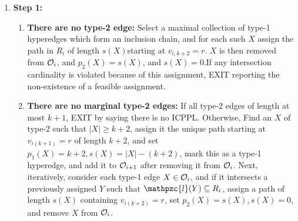 \documentclass[11pt,letter]{../lib/llncs}
\def\cO{{\cal O}}
\def\cl{\mathpzc{l}}
\begin{document}
\begin{enumerate}
\item {\bf Step 1:}  
\begin{enumerate}
\item {\bf There are no type-2 edge:}  Select a maximal collection of type-1 hyperedges which form an inclusion chain, and for each such $X$ assign the path in $R_i$ of length $s(X)$starting at $v_{i,k+2}=r$.  $X$ is then removed from $\cO_i$, and $p_2(X)=s(X)$, and $s(X)=0$.If any intersection cardinality is violated because of this assignment,  EXIT reporting the non-existence of a feasible assignment. 
\item {\bf There are no marginal type-2 edges:}  If all type-2 edges of length at most $k+1$, EXIT by saying there is no ICPPL.  Otherwise, Find an $X$ of type-2 such that $|X| \geq k+2$, assign it the unique path starting at $v_{i(k+1)}=r$ of length $k+2$, and set $p_1(X)=k+2, s(X)=|X|-(k+2)$, mark this as a type-1 hyperedge, and add it to $\cO_{i+1}$ after removing it from $\cO_i$.  Next, iteratively, consider each type-1 edge $X \in \cO_i$, and if it intersects a previously assigned $Y$ such that $\cl(Y) \subseteq R_i$, assign a path of length $s(X)$ containing $v_{i(k+2)}=r$, set $p_2(X)=s(X), s(X)=0$, and remove $X$ from $\cO_i$. 


\end{enumerate}
\end{enumerate}
\end{document}
